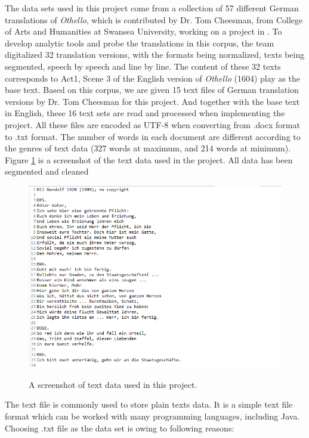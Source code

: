 The data sets used in this project come from a collection of 57 different German translations of \emph{Othello}, which is contributed by Dr. Tom Cheesman, from College of Arts and Humanities at Swansea University, working on a project in \cite{Tom2012}. To develop analytic tools and probe the translations in this corpus, the team digitalized 32 translation versions, with the formats being normalized, texts being segmented, speech by speech and line by line. The content of these 32 texts corresponds to Act1, Scene 3 of the English version of \emph{Othello} (1604) play as the base text.  Based on this corpus, we are given 15 text files of German translation versions by Dr. Tom Cheesman for this project. And together with the base text in English, these 16 text sets are read and processed when implementing the project. All these files are encoded as UTF-8 when converting from .docx format to .txt format. The number of words in each document are different according to the genres of text data (327 words at maximum, and 214 words at minimum). Figure \ref{fig:dataExample} is a screenshot of the text data used in the project. All data has been segmented and cleaned
\begin{figure}[H]
	\centering    
	\includegraphics[scale=0.8]{Figs/Data-example}\\[1ex]
	\caption{A screenshot of text data used in this project.}
	\label{fig:dataExample}
\end{figure}
The text file is commonly used to store plain texts data.  It is a simple text file format which can be worked with many programming languages, including Java. Choosing .txt file as the data set is owing to following reasons:

